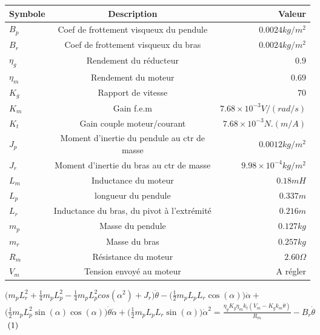 \documentclass[12pt, a4paper, openany]{report}
\begin{document}
     

\begin{center}
\begin{tabular}{|l|c|r|}
\hline \rowcolor{mauve} Symbole & Description &  Valeur  \\
\hline $B_{p}$  &  Coef de frottement visqueux du pendule  & $0.0024 kg/m^{2}$   \\
\hline $B_{r}$ & Coef de frottement visqueux du bras & $0.0024 kg/m^{2}$ \\
\hline $\eta_{g}$  &  Rendement du réducteur  & $0.9$  \\
\hline $\eta_{m}$  &  Rendement du moteur  & $0.69$  \\
\hline $K_{g}$  &  Rapport de vitesse  & $70$  \\
\hline $K_{m}$  &  Gain f.e.m  & $7.68\times10^{-3} V/(rad/s)$ \\
\hline $K_{t}$  &  Gain couple moteur/courant  & $7.68\times10^{-3} N.(m/A)$\\
\hline $J_{p}$ &  Moment d'inertie du pendule au ctr de masse & $0.0012 kg/m^{2}$ \\
\hline $J_{r}$  &  Moment d'inertie du bras au ctr de masse  & $9.98\times10^{-4} kg/m^{2}$ \\
\hline $L_{m}$  &   Inductance du moteur & $0.18 mH$\\
\hline $L_{p}$  &  longueur du pendule  & $0.337 m$ \\
\hline $L_{r}$  &  Inductance du bras, du pivot à l'extrémité   & $0.216 m$ \\
\hline $m_{p}$  &  Masse du pendule  & $0.127 kg$\\
\hline $m_{r}$  &   Masse du bras  & $0.257 kg$\\
\hline $R_{m}$  &   Résistance du moteur  & $2.60 \Omega$ \\
\hline $V_{m}$  &  Tension envoyé au moteur   &  A régler \\

\hline 
\end{tabular}
\end{center} 

$\bigg(m_{p}L_{r}^{2} + \frac{1}{4}m_{p}L_{p}^{2} - \frac{1}{4}m_{p}L_{p}^{2}cos(\alpha^{2}) + J_{r} \bigg)\ddot{\theta}- \bigg(\frac{1}{2}m_{p}L_{p}L_{r}\cos(\alpha) \bigg)\ddot{\alpha}+$\\  $\bigg(\frac{1}{2}m_{p}L_{p}^{2}\sin(\alpha)\cos(\alpha) \bigg)\dot{\theta}\dot{\alpha} + \bigg(\frac{1}{2}m_{p}L_{p}L_{r}\sin(\alpha) \bigg)\dot{\alpha}^{2}=\frac{\eta_{g}K_{g}\eta_{m}k_{t}(V_{m}- K_{g}k_{m}\dot{\theta})}{R_{m}}-B_{r}\dot{\theta}$ $\hspace{1mm}(1)$ \\\\\\\\ 
\end{document}
